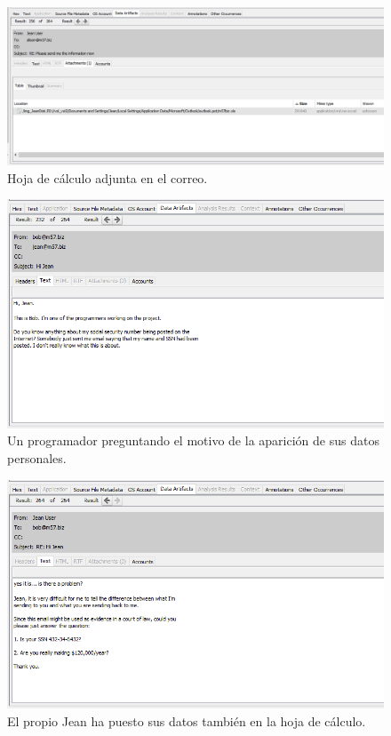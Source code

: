 \documentclass{article}
\begin{document}
\begin{figure}[H]
    \centering
    \includegraphics[width=\textwidth]{imagenes/Windows/Captura de pantalla (14).png}
    \caption{Hoja de cálculo adjunta en el correo.}
\end{figure}

\begin{figure}[H]
    \centering
    \includegraphics[width=\textwidth]{imagenes/Windows/Captura de pantalla (15).png}
    \caption{Un programador preguntando el motivo de la aparición de sus datos personales.}
\end{figure}

\begin{figure}[H]
    \centering
    \includegraphics[width=\textwidth]{imagenes/Windows/Captura de pantalla (16).png}
    \caption{El propio Jean ha puesto sus datos también en la hoja de cálculo.}
\end{figure}
\end{document}
